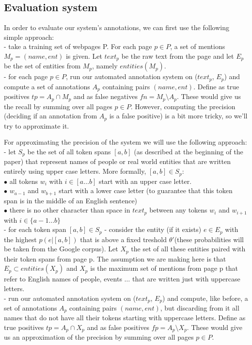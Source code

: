 \documentclass{article}
\begin{document}
{\color{blue}
\subsection*{Evaluation system}
In order to evaluate our system's annotations, we can first use the following simple approach:\\
- take a training set of webpages P. For each page $p\in P$, a set of mentions $M_p = (name,ent)$ is given. Let $text_p$ be the raw text from the page and let $E_p$ be the set of entities from $M_p$, namely $entities(M_p)$. \\
- for each page $p\in P$, run our automated annotation system on ($text_p$, $E_p$) and compute a set of annotations $A_p$ containing pairs $(name,ent)$. Define as true positives $tp=A_p \cap M_p$ and as false negatives $fn=M_p \setminus A_p$. These would give us the recall by summing over all pages $p\in P$. However, computing the precision (deciding if an annotation from $A_p$ is a false positive) is a bit more tricky, so we'll try to approximate it. \\

\par For approximating the precision of the system we will use the following approach: \\
- let $S_p$ be the set of all token spans $[a,b]$ (as described at the beginning of the paper) that represent names of people or real world entities that are written entirely using upper case letters. More formally, $[a,b]\in S_p$: \\
$\bullet$ all tokens $w_i$ with $i\in [a\ldots b]$ start with an upper case letter. \\
$\bullet$ $w_{a-1}$ and $w_{b+1}$ start with a lower case letter (to guarantee that this token span is in the middle of an English sentence)\\
$\bullet$ there is no other character than space in $text_p$ between any tokens $w_i$ and $w_{i+1}$ with $i\in \{a-1 \ldots b\}$\\
- for each token span $[a,b] \in S_p$ - consider the entity (if it exists) $e\in E_p$ with the highest $p(e | [a,b])$ that is above a fixed treshold $\theta'$(these probabilities will be taken from the Google corpus). Let $X_p$ the set of all these entities paired with their token spans from page p. The assumption we are making here is that $E_p \subset entities(X_p)$ and $X_p$ is the maximum set of mentions from page p that refer to English names of people, events $\ldots$ that are written just with uppercase letters.\\
- run our automated annotation system on ($text_p$, $E_p$) and compute, like before, a set of annotations $A_p$ containing pairs  $(name,ent)$, but discarding from it all names that do not have all their tokens starting with uppercase letters. Define as true positives $tp=A_p \cap X_p$ and as false positives $fp=A_p \setminus X_p$. These would give us an approximation of the precision by summing over all pages $p\in P$. 
}
 
\end{document}
